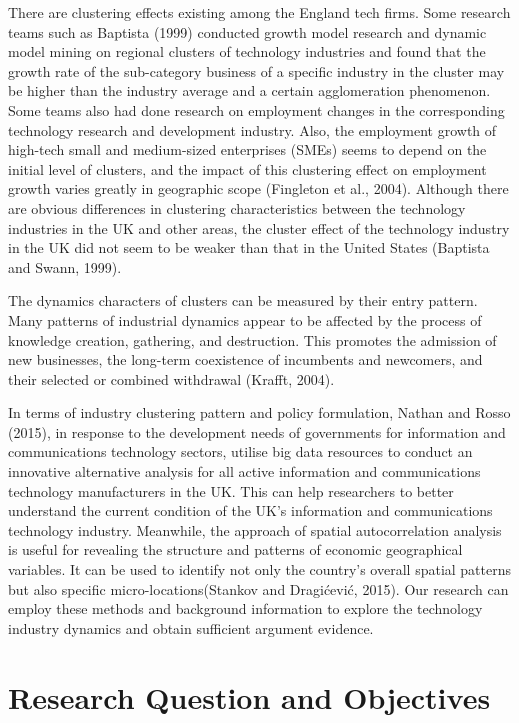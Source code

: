 \documentclass[
  12pt,
  oneside]{book}
\begin{document}
There are clustering effects existing among the England tech firms. Some research teams such as Baptista (1999) conducted growth model research and dynamic model mining on regional clusters of technology industries and found that the growth rate of the sub-category business of a specific industry in the cluster may be higher than the industry average and a certain agglomeration phenomenon. Some teams also had done research on employment changes in the corresponding technology research and development industry. Also, the employment growth of high-tech small and medium-sized enterprises (SMEs) seems to depend on the initial level of clusters, and the impact of this clustering effect on employment growth varies greatly in geographic scope (Fingleton et al., 2004). Although there are obvious differences in clustering characteristics between the technology industries in the UK and other areas, the cluster effect of the technology industry in the UK did not seem to be weaker than that in the United States (Baptista and Swann, 1999).

The dynamics characters of clusters can be measured by their entry pattern. Many patterns of industrial dynamics appear to be affected by the process of knowledge creation, gathering, and destruction. This promotes the admission of new businesses, the long-term coexistence of incumbents and newcomers, and their selected or combined withdrawal (Krafft, 2004).

In terms of industry clustering pattern and policy formulation, Nathan and Rosso (2015), in response to the development needs of governments for information and communications technology sectors, utilise big data resources to conduct an innovative alternative analysis for all active information and communications technology manufacturers in the UK. This can help researchers to better understand the current condition of the UK's information and communications technology industry. Meanwhile, the approach of spatial autocorrelation analysis is useful for revealing the structure and patterns of economic geographical variables. It can be used to identify not only the country's overall spatial patterns but also specific micro-locations(Stankov and Dragićević, 2015). Our research can employ these methods and background information to explore the technology industry dynamics and obtain sufficient argument evidence.

\hypertarget{research-question-and-objectives}{%
\section{Research Question and Objectives}\label{research-question-and-objectives}}
\end{document}
